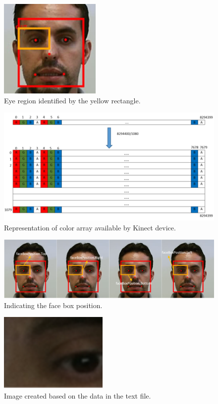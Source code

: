 \documentclass[10pt, conference]{IEEEtran}
\begin{document}
\begin{figure}[t]
	\centering
	\includegraphics{figures/pic10.png}
    \caption{Eye region identified by the yellow rectangle.}
    \label{fig:fig9}
\end{figure}

\begin{figure}[t]
	\centering
	\includegraphics{figures/pic11.png}
    \caption{Representation of color array available by Kinect device.}
    \label{fig:fig10}
\end{figure}

\begin{figure}[t]
	\centering
	\includegraphics{figures/pic12.png}
    \caption{Indicating the face box position.}
    \label{fig:fig11}
\end{figure}

\begin{figure}[t]
	\centering
	\includegraphics{figures/pic13.png}
    \caption{Image created based on the data in the text file.}
    \label{fig:fig12}
\end{figure}
\end{document}
